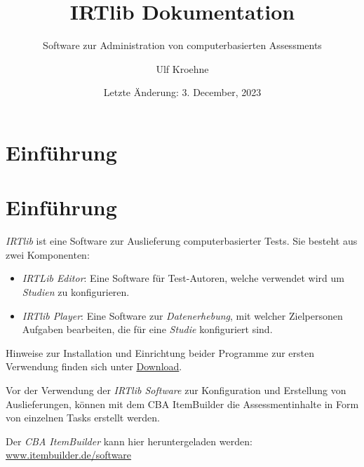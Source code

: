 \documentclass[
  letterpaper,
  DIV=11]{scrreprt}
\title{IRTlib Dokumentation}
\subtitle{Software zur Administration von computerbasierten Assessments}
\author{Ulf Kroehne}
\date{Letzte Änderung: 3. December, 2023}
\providecommand{\tightlist}{%
  \setlength{\itemsep}{0pt}\setlength{\parskip}{0pt}}\usepackage{longtable,booktabs,array}
\renewcommand*\contentsname{Inhaltsverzeichnis}
\newcommand\contentsname{Inhaltsverzeichnis}
\begin{document}
\maketitle
\ifdefined\Shaded\renewenvironment{Shaded}{\begin{tcolorbox}[frame hidden, borderline west={3pt}{0pt}{shadecolor}, sharp corners, interior hidden, breakable, boxrule=0pt, enhanced]}{\end{tcolorbox}}\fi

\renewcommand*\contentsname{Inhaltsverzeichnis}
{
\hypersetup{linkcolor=}
\setcounter{tocdepth}{2}
\tableofcontents
}

\hypertarget{einfuxfchrung}{%
\chapter{Einführung}\label{einfuxfchrung}}

\let\standardclearpage\clearpage
\let\clearpage\relax


\hypertarget{einfuxfchrung-1}{%
\chapter{Einführung}\label{einfuxfchrung-1}}

\emph{IRTlib} ist eine Software zur Auslieferung computerbasierter
Tests. Sie besteht aus zwei Komponenten:

\begin{itemize}
\tightlist
\item
  \emph{IRTLib Editor}: Eine Software für Test-Autoren, welche verwendet
  wird um \emph{Studien} zu konfigurieren.
\item
  \emph{IRTlib Player}: Eine Software zur \emph{Datenerhebung}, mit
  welcher Zielpersonen Aufgaben bearbeiten, die für eine \emph{Studie}
  konfiguriert sind.
\end{itemize}

Hinweise zur Installation und Einrichtung beider Programme zur ersten
Verwendung finden sich unter
\protect\hyperlink{download-installation}{Download}.

Vor der Verwendung der \emph{IRTlib Software} zur Konfiguration und
Erstellung von Auslieferungen, können mit dem CBA ItemBuilder die
Assessmentinhalte in Form von einzelnen Tasks erstellt werden.

Der \emph{CBA ItemBuilder} kann hier heruntergeladen werden:
\href{https://www.itembuilder.de/software}{www.itembuilder.de/software}
\end{document}
